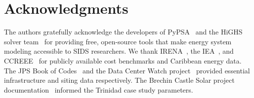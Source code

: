 \documentclass[conference,10pt]{IEEEtran}
\begin{document}
\section*{Acknowledgments}

The authors gratefully acknowledge the developers of PyPSA~\cite{pypsa} and the HiGHS solver team~\cite{highs} for providing free, open-source tools that make energy system modeling accessible to SIDS researchers. We thank IRENA~\cite{irena2023}, the IEA~\cite{iea2024}, and CCREEE~\cite{ccreee2023} for publicly available cost benchmarks and Caribbean energy data. The JPS Book of Codes~\cite{jps_grid} and the Data Center Watch project~\cite{dcwatch2025} provided essential infrastructure and siting data respectively. The Brechin Castle Solar project documentation~\cite{brechin2025,brechin_bp} informed the Trinidad case study parameters.

\balance
\end{document}
